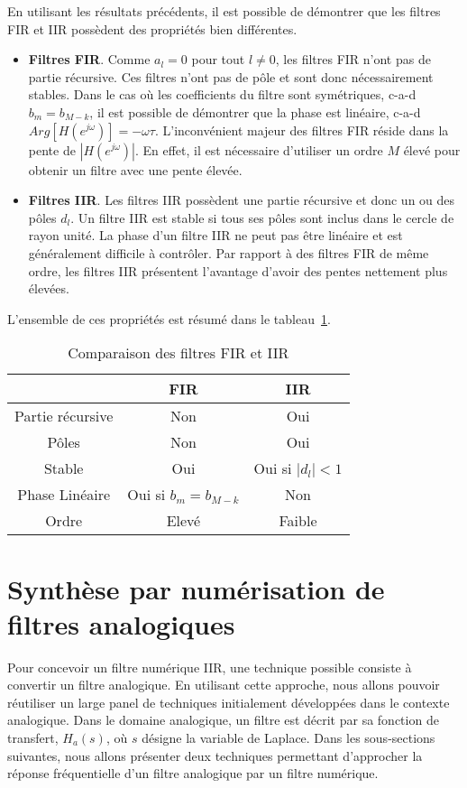 \documentclass[11pt,a4paper]{IEEEtran}
\begin{document}
En utilisant les résultats précédents, il est possible de démontrer que les filtres FIR et IIR possèdent des propriétés bien différentes.
\begin{itemize}
\item \textbf{Filtres FIR}. Comme $a_l=0$ pour tout $l\ne 0$, les filtres FIR n'ont pas de partie récursive. Ces filtres n'ont pas de pôle et sont donc nécessairement stables. Dans le cas où les coefficients du filtre sont symétriques, c-a-d $b_m=b_{M-k}$, il est possible de démontrer que la phase est linéaire, c-a-d $Arg[H(e^{j\omega})]=-\omega \tau$. L'inconvénient majeur des filtres FIR réside dans la pente de $|H(e^{j\omega})|$. En effet, il est nécessaire d'utiliser un ordre $M$ élevé pour obtenir un filtre avec une pente élevée.
\item \textbf{Filtres IIR}. Les filtres IIR possèdent une partie récursive et donc un ou des pôles $d_l$. Un filtre IIR est stable si tous ses pôles sont inclus dans le cercle de rayon unité. La phase d'un filtre IIR ne peut pas être linéaire et est généralement difficile à contrôler. Par rapport à des filtres FIR de même ordre, les filtres IIR présentent l'avantage d'avoir des pentes nettement plus élevées. 
\end{itemize}
L'ensemble de ces propriétés est résumé dans le tableau~\ref{t_comp_filtres}.
\begin{table}
\centering
\begin{tabular}{ccc}
& FIR & IIR \\
\hline
Partie récursive  & Non & Oui\\
Pôles & Non & Oui \\
Stable & Oui & Oui si $|d_l|<1$\\
Phase Linéaire & Oui si  $b_m=b_{M-k}$& Non\\
Ordre & Elevé & Faible \\
\hline
\end{tabular}
\caption{Comparaison des filtres FIR et IIR}\label{t_comp_filtres}
\end{table}



\section{Synthèse par numérisation de filtres analogiques}

Pour concevoir un filtre numérique IIR, une technique possible consiste à convertir un filtre analogique. En utilisant cette approche, nous allons pouvoir réutiliser un large panel de techniques initialement développées dans le contexte analogique. Dans le domaine analogique, un filtre est décrit par sa fonction de transfert, $H_a(s)$, où $s$ désigne la variable de Laplace. Dans les sous-sections suivantes, nous allons présenter deux techniques permettant d'approcher la réponse fréquentielle d'un filtre analogique par un filtre numérique. 
\end{document}
